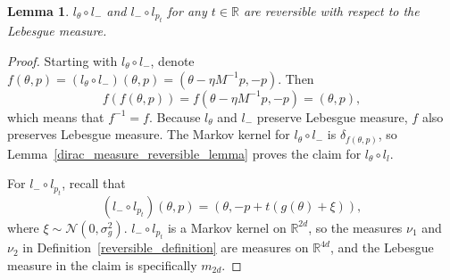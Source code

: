 \documentclass[english,twoside,openright]{HYgraduMLDS}
\newtheorem{lemma}{Lemma}[chapter]
\newcommand{\R}{\mathbb{R}}
\newcommand{\caln}{{\mathcal{N}}}
\begin{document}
\begin{lemma}\label{leapfrog_step_reversible_lemma}
  \(l_{\theta}\circ l_{-}\) and \(l_{-}\circ l_{p_{t}}\) for any \(t\in \R\)
  are reversible with respect to the Lebesgue measure.
\end{lemma}
\begin{proof}
  Starting with \(l_{\theta}\circ l_{-}\), denote
  \(f(\theta, p) = (l_{\theta}\circ l_{-})(\theta, p)
  = (\theta - \eta M^{-1}p, -p)\). Then
  \[
    f(f(\theta, p)) = f(\theta - \eta M^{-1}p, -p) = (\theta, p),
  \]
  which means that \(f^{-1} = f\). Because \(l_{\theta}\) and \(l_{-}\) preserve
  Lebesgue measure, \(f\) also preserves Lebesgue measure.
  The Markov kernel for \(l_{\theta}\circ l_{-}\) is \(\delta_{f(\theta, p)}\),
  so Lemma~\ref{dirac_measure_reversible_lemma} proves the claim for
  \(l_{\theta}\circ l_{l}\).

  For \(l_{-}\circ l_{p_{t}}\), recall that
  \[
    (l_{-}\circ l_{p_{t}})(\theta, p) = (\theta, -p + t(g(\theta) + \xi)),
  \]
  where \(\xi \sim \caln(0, \sigma_{g}^{2})\).
  \(l_{-}\circ l_{p_{t}}\) is a Markov kernel on \(\R^{2d}\),
  so the measures \(\nu_{1}\) and \(\nu_{2}\) in
  Definition~\ref{reversible_definition} are measures on \(\R^{4d}\), and
  the Lebesgue measure in the claim is specifically \(m_{2d}\).


\end{proof}
\end{document}
